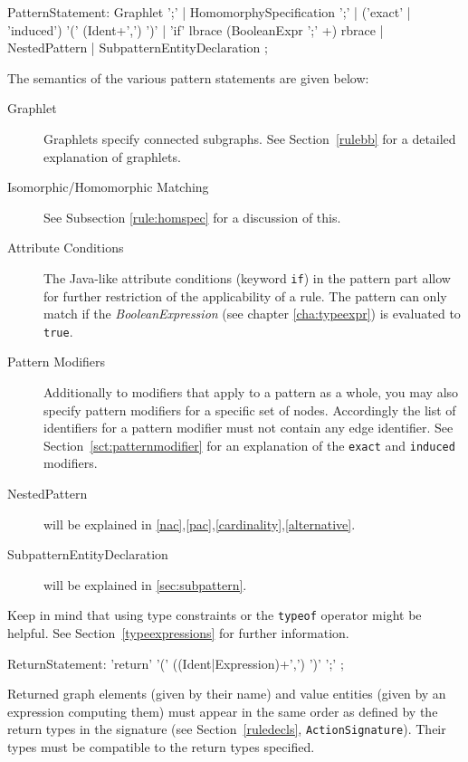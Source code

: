\begin{rail}
  PatternStatement:
    Graphlet ';' |
    HomomorphySpecification ';' |
    ('exact' | 'induced') '(' (Ident+',') ')' |
    'if' lbrace (BooleanExpr ';' +) rbrace |
    NestedPattern |
    SubpatternEntityDeclaration
    ;
\end{rail}
The semantics of the various pattern statements are given below:
\begin{description}
  \item[Graphlet] Graphlets specify connected subgraphs. See Section~\ref{rulebb} for a detailed explanation of graphlets.
  \item[Isomorphic/Homomorphic Matching] See Subsection \ref{rule:homspec} for a discussion of this.
  \item[Attribute Conditions] The Java-like attribute conditions (keyword \texttt{if}) in the pattern part allow for further restriction of the applicability of a rule. The pattern can only match if the \emph{BooleanExpression} (see chapter \ref{cha:typeexpr}) is evaluated to \texttt{true}.
  \item[Pattern Modifiers] Additionally to modifiers that apply to a pattern as a whole, you may also specify pattern modifiers for a specific set of nodes. Accordingly the list of identifiers for a pattern modifier must not contain any edge identifier. See Section~\ref{sct:patternmodifier} for an explanation of the \texttt{exact} and \texttt{induced} modifiers.
  \item[NestedPattern] will be explained in \ref{nac},\ref{pac},\ref{cardinality},\ref{alternative}.
  \item[SubpatternEntityDeclaration] will be explained in \ref{sec:subpattern}.
\end{description}

Keep in mind that using type constraints or the \texttt{typeof} operator might be helpful. See Section~\ref{typeexpressions} for further information.

\begin{rail}
  ReturnStatement: 'return' '(' ((Ident|Expression)+',') ')' ';' ;
\end{rail}
Returned graph elements (given by their name) and value entities (given by an expression computing them) must appear in the same order as defined by the return types in the signature (see Section~\ref{ruledecls}, \texttt{ActionSignature}).
Their types must be compatible to the return types specified.

